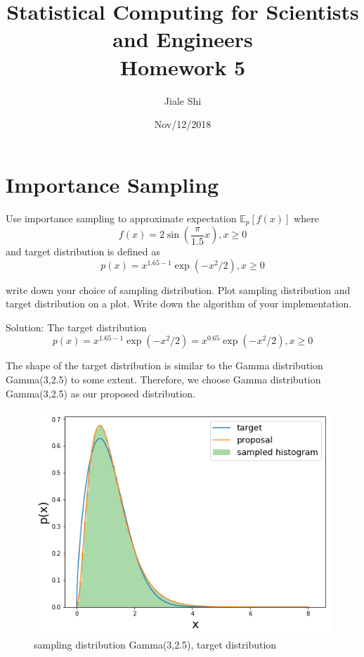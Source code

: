 \documentclass{article}
\title{Statistical Computing for Scientists and Engineers\\[1em] Homework 5}
\author{Jiale Shi}
\date{Nov/12/2018}
\begin{document}
\maketitle

\newpage

\section{Importance Sampling}
Use importance sampling to approximate expectation $\mathbb{E}_{p}[f(x)]$ where
\begin{equation}
    f(x) = 2\sin(\frac{\pi}{1.5}x) , x\geq 0
\end{equation}
and target distribution is defined as 
\begin{equation}
    p(x) = x^{1.65-1}\exp(-x^2/2), x\geq 0
\end{equation}

write down your choice of sampling distribution. Plot sampling distribution and target distribution on a plot. Write down the algorithm of your implementation.

Solution:
The target distribution 
\begin{equation}
    p(x) = x^{1.65-1}\exp(-x^2/2) =x^{0.65}\exp(-x^2/2) , x\geq 0
\end{equation}

The shape of the target distribution is similar to the Gamma distribution Gamma(3,2.5) to some extent. Therefore, we choose Gamma distribution Gamma(3,2.5) as our proposed distribution.

\begin{figure}[h!]
\centering
\includegraphics[scale=0.6]{HW5P1_1.png}
\caption{sampling distribution Gamma(3,2.5), target distribution}
\end{figure}
\end{document}
